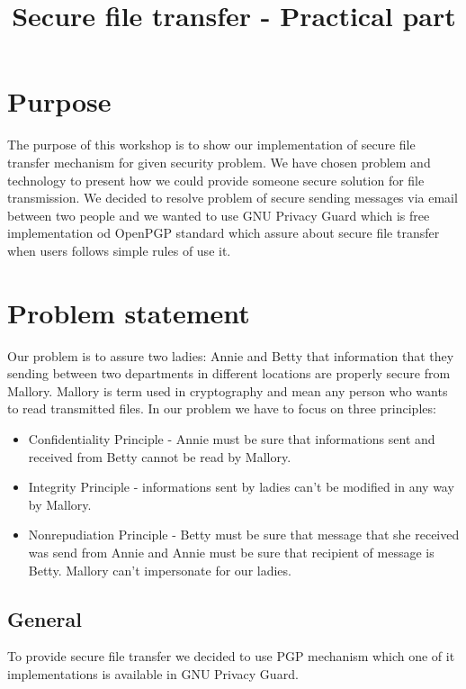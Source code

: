 \documentclass{classrep}
\author{
  \studentinfo{Michał Sośnicki}{207597} \and
  \studentinfo{Daniel Pęczek}{207585}
}
\title{Secure file transfer - Practical part}
\begin{document}
\maketitle
\newpage

\section{Purpose}

The purpose of this workshop is to show our implementation of secure file transfer mechanism for given security problem. We have chosen problem and technology to present how we could provide someone secure solution for file transmission. We decided to resolve problem of secure sending messages via email between two people and we wanted to use GNU Privacy Guard which is free implementation od OpenPGP standard which assure about secure file transfer when users follows simple rules of use it.

\section{Problem statement}

Our problem is to assure two ladies: Annie and Betty that information that they sending between two departments in different locations are properly secure from Mallory. Mallory is term used in cryptography and mean any person who wants to read transmitted files. In our problem we have to focus on three principles:

\begin{itemize}
\item Confidentiality Principle - Annie must be sure that informations sent and received from Betty cannot be read by Mallory. 
\item Integrity Principle - informations sent by ladies can't be modified in any way by Mallory.
\item Nonrepudiation Principle - Betty must be sure that message that she received was send from Annie and Annie must be sure that recipient of message is Betty. Mallory can't impersonate for our ladies.
\end{itemize}

\subsection{General}

To provide secure file transfer we decided to use PGP mechanism which one of it implementations is available in GNU Privacy Guard. 
\end{document}
